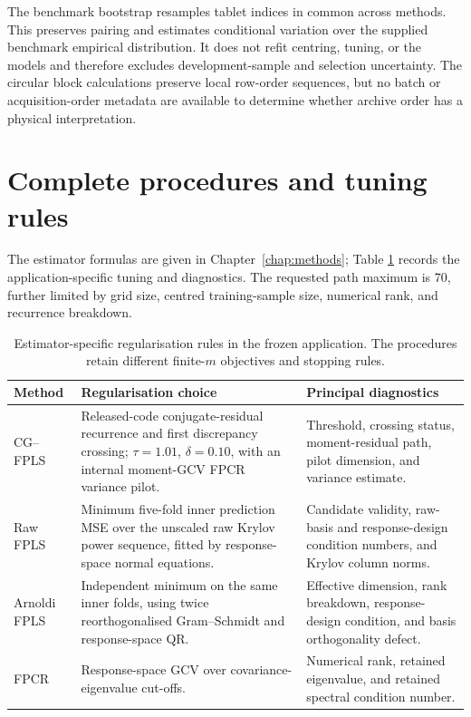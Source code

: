 The benchmark bootstrap resamples tablet indices in common across methods.
This preserves pairing and estimates conditional variation over the supplied
benchmark empirical distribution.  It does not refit centring, tuning, or the
models and therefore excludes development-sample and selection uncertainty.
The circular block calculations preserve local row-order sequences, but no
batch or acquisition-order metadata are available to determine whether archive
order has a physical interpretation.

\section{Complete procedures and tuning rules}
\label{sec:app-spectroscopy-tuning}

The estimator formulas are given in Chapter~\ref{chap:methods}; Table
\ref{tab:app-spectroscopy-procedures} records the application-specific tuning
and diagnostics.  The requested path maximum is 70, further limited by grid
size, centred training-sample size, numerical rank, and recurrence breakdown.

\begin{table}[htbp]
    \centering
    \scriptsize
    \caption[Regularisation rules in the empirical application]{Estimator-specific regularisation rules in the frozen application.
    The procedures retain different finite-$m$ objectives and stopping rules.}
    \label{tab:app-spectroscopy-procedures}
    \begin{tabular}{@{}p{2.4cm}p{6.3cm}>{\raggedright\arraybackslash}p{5.1cm}@{}}
        \toprule
        Method & Regularisation choice & Principal diagnostics \\
        \midrule
        CG--FPLS
          & Released-code conjugate-residual recurrence and first discrepancy
            crossing; $\tau=1.01$, $\delta=0.10$, with an internal moment-GCV
            FPCR variance pilot.
          & Threshold, crossing status, moment-residual path, pilot dimension,
            and variance estimate. \\
        Raw FPLS
          & Minimum five-fold inner prediction MSE over the unscaled raw Krylov
            power sequence, fitted by response-space normal equations.
          & Candidate validity, raw-basis and response-design condition numbers,
            and Krylov column norms. \\
        Arnoldi FPLS
          & Independent minimum on the same inner folds, using twice
            reorthogonalised Gram--Schmidt and response-space QR.
          & Effective dimension, rank breakdown, response-design condition,
            and basis orthogonality defect. \\
        FPCR
          & Response-space GCV over covariance-eigenvalue cut-offs.
          & Numerical rank, retained eigenvalue, and retained spectral
            condition number. \\
        \bottomrule
    \end{tabular}
\end{table}

